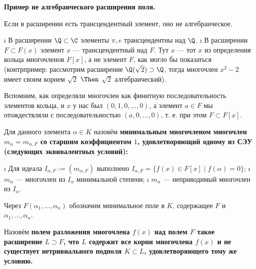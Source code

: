 \begin{defn}
\bf{Пример не алгебраического расширения поля.}

Если в расширении есть трансцендентный элемент, оно не алгебраическое.

\begin{itemize}
\tightlist
\i
  В расширении \(\Q \subset \C\) элементы \(\pi, e\) трансцендентны над \(\Q\).
\i
  В расширении \(F \subset F(x)\) элемент \(x\) --- трансцендентный над \(F\). Тут \(x\) --- тот $x$ из определения кольца многочленов $F[x]$, а не элемент \(F\), как могло бы показаться (контрпример: рассмотрим расширение \(\Q(\sqrt{2}) \supset \Q\), тогда многочлен \(x^2-2\) имеет своим корнем \(\sqrt{2}\) \(\Then\) \(\sqrt{2}\) алгебраический).
  
  Вспомним, как определяли многочлен как финитную последовательность элементов кольца, и $x$ у нас был $(0, 1, 0, \dots, 0)$, а элемент $a \in F$ мы отождествляли с последовательностью $(a, 0, \dots, 0)$, т. е. при этом $F \subset F[x]$.
\end{itemize}

\end{defn}

\begin{defn}
Для данного элемента \(\alpha \in K\) назовём \bf{минимальным многочленом} многочлен \(m_{\alpha} = m_{\alpha,F}\) со старшим коэффициентом \(1\), удовлетворяющий одному из СЭУ (следующих эквивалентных условий):

\begin{enumerate}
\def\labelenumi{\arabic{enumi}.}
\tightlist
\i
  Для идеала \(I_{\alpha, F} := (m_{\alpha, F})\) выполнено \(I_{\alpha,F} = \{f(x) \in F[x] \mid f(\alpha)=0\}\);
\i
  \(m_{\alpha}\) --- многочлен из \(I_{\alpha}\) минимальной степени;
\i
  \(m_{\alpha}\) --- неприводимый многочлен из \(I_{\alpha}\).
\end{enumerate}

\end{defn}

\begin{defn}
Через \(F(\alpha_1,\ldots,\alpha_n)\) обозначим минимальное поле в \(K\), содержащее \(F\) и \(\alpha_1,\ldots,\alpha_n\).
\end{defn}

\begin{defn}
Назовём \bf{полем разложения} многочлена \(f(x)\) над полем \(F\) такое расширение \(L \supset F\), что \(L\) содержит все корни многочлена \(f(x)\) и не существует нетривиального подполя \(K \subset L\), удовлетворяющего тому же условию.
\end{defn}

